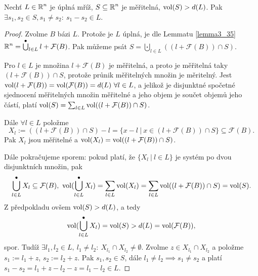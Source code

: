 \begin{theorem}[Blichfeldt]\label{blichfeldt}
Nechť $L \in \operatorname{\mathbb{R}}^n$ je úplná mříž, $S \subseteq \operatorname{\mathbb{R}}^n$ je měřitelná, $\operatorname{vol}(S) > d(L)$. Pak $\exists s_1, s_2 \in S, s_1 \neq s_2: \ s_1 - s_2 \in L$.
\end{theorem}
\begin{proof}
Zvolme $B$ bázi $L$. Protože je $L$ úplná, je dle Lemmatu \ref{lemma3_35} $\operatorname{\mathbb{R}}^n = \operatorname*{\overset{\bullet}{\bigcup}}_{l \in L} l + \mathcal{F}(B)$. Pak můžeme psát $S = \bigcupdot_{l \in L} \left( (l + \mathcal{F}(B)) \cap S \right)$.

Pro $l \in L$ je množina $l + \mathcal{F}(B)$ je měřitelná, a proto je měřitelná taky $(l + \mathcal{F}(B)) \cap S$, protože průnik měřitelných množin je měritelný. Jest $\operatorname{vol}(l + \mathcal{F}(B)) = \operatorname{vol}(\mathcal{F}(B)) = d(L) \ \forall l \in L$, a jelikož je disjunktné spočetné sjednocení měřitelných množin měřitelné a jeho objem je součet objemů jeho částí, platí $\operatorname{vol}(S) = \sum_{l \in L} \operatorname{vol}((l + \mathcal{F}(B)) \cap S)$.

Dále $\forall l \in L$ položme $$X_l := ((l + \mathcal{F}(B)) \cap S) - l = \{ x-l \ | \ x \in (l + \mathcal{F}(B))\cap S\} \subseteq \mathcal{F}(B).$$ Pak $X_l$ jsou měřitelné a $\operatorname{vol}(X_l) = \operatorname{vol}((l + \mathcal{F}(B))\cap S)$.

Dále pokračujeme sporem: pokud platí, že $\{X_l \ | \ l \in L\}$ je systém po dvou disjunktních množin, pak $$\operatorname*{\overset{\bullet}{\bigcup}}_{l \in L} X_l \subseteq \mathcal{F}(B), \ \operatorname{vol}(\operatorname*{\overset{\bullet}{\bigcup}}_{l \in L} X_l) = \sum_{l \in L} \operatorname{vol}(X_l) = \sum_{l \in L} \operatorname{vol}((l + \mathcal{F}(B))\cap S) = \operatorname{vol}(S).$$ Z předpokladu ovšem $\operatorname{vol}(S) > d(L)$, a tedy $$\operatorname{vol}(\operatorname*{\overset{\bullet}{\bigcup}}_{l \in L} X_l) = \operatorname{vol}(S) > d(L) = \operatorname{vol}(\mathcal{F}(B)),$$spor. Tudíž $\exists l_1, l_2 \in L, \ l_1 \neq l_2: \ X_{l_1} \cap X_{l_2} \neq \emptyset$. Zvolme $z \in X_{l_1} \cap X_{l_2}$ a položme $s_1 := l_1 + z$, $s_2 := l_2 + z$. Pak $s_1, s_2 \in S$, dále $l_1 \neq l_2 \implies s_1 \neq s_2$ a platí $s_1 - s_2 = l_1 + z - l_2 - z = l_1 - l_2 \in L$.
\end{proof}